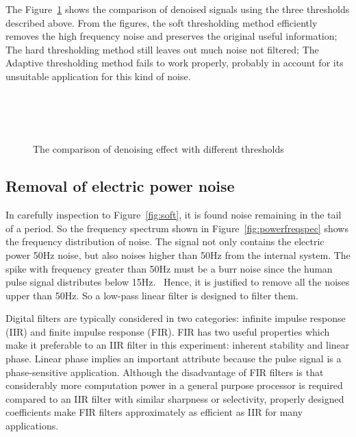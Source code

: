 The Figure~\ref{fig:threshold} shows the comparison of denoised
signals using the three thresholds described above. From the figures,
the soft thresholding method efficiently removes the high frequency
noise and preserves the original useful information; The hard
thresholding method still leaves out much noise not filtered; The
Adaptive thresholding method fails to work properly, probably in
account for its unsuitable application for this kind of noise.
\begin{figure}
  \centering
  \\
  \\
  \\
  \caption{The comparison of denoising effect with different thresholds}
  \label{fig:threshold}
\end{figure}

\subsection{Removal of electric power noise}
In carefully inspection to Figure~\ref{fig:soft}, it is found 
noise remaining in the tail of a period. So the frequency spectrum shown in
Figure~\ref{fig:powerfreqspec} shows the frequency distribution of noise.
The signal not only contains the electric power 50Hz noise, but also
noises higher than 50Hz from the internal system. 
The spike with frequency greater than 50Hz must be a burr noise since
the human pulse signal distributes below 15Hz.~\cite{wei1985frequency}
Hence, it is justified to remove all the noises upper than 50Hz.
So a low-pass linear filter is designed to filter them. 

Digital filters are typically considered in two categories: infinite impulse
response (IIR) and finite impulse response (FIR). FIR has two useful
properties which make it preferable to an IIR filter in this
experiment: inherent stability and linear phase. Linear phase implies an
important attribute because the pulse signal is a phase-sensitive
application. Although the disadvantage of FIR filters is that considerably more
computation power in a general purpose processor is required compared
to an IIR filter with similar sharpness or selectivity, properly
designed coefficients make FIR filters approximately as efficient as
IIR for many applications. 

